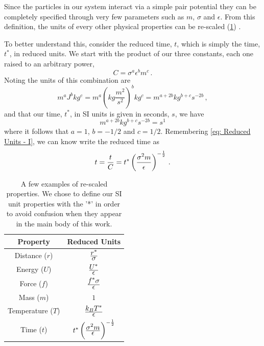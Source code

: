 \documentclass[../../main.tex]{subfiles}
\begin{document}
\begin{appendices}
    Since the particles in our system interact via a simple pair potential they can be completely specified through very few parameters such as $m$, $\sigma$ and $\epsilon$. From this definition, the units of every other physical properties can be re-scaled (\cref{tab: Reduced Units}) \cite{allenComputerSimulationLiquids2017}.
    
    To better understand this, consider the reduced time, $t$, which is simply the time, $t^*$, in reduced units. We start with the product of our three constants, each one raised to an arbitrary power,
    \begin{equation}\label{eq: Reduced Units - I}
        C = \sigma^a \epsilon^b m^c \,.
    \end{equation}
    Noting the units of this combination are
        \begin{equation}
                m^a J^b kg^c = m^a \left(kg \frac{m^2}{s^2}\right)^b kg^c = m^{a+2b} kg^{b+c} s^{-2b}\,,
        \end{equation}
    and that our time, $t^*$, in SI units is given in seconds, $s$, we have
        \begin{equation}
            m^{a+2b} kg^{b+c} s^{-2b} = s^1
        \end{equation}
    where it follows that $a = 1$, $b = -1/2$ and $c = 1/2$. Remembering \cref{eq: Reduced Units - I}, we can know write the reduced time as
        \begin{equation}
            t = \frac{t}{C} = t^* \left( \frac{\displaystyle \sigma^2m}{\displaystyle \epsilon} \right)^{-\frac{1}{2}}\,.
        \end{equation}
    \begin{table}[h]
        \centering
        \caption{A few examples of re-scaled properties. We chose to define our SI unit properties with the '*' in order to avoid confusion when they appear in the main body of this work.}
        \begin{tabular}{ || c | c || }
            \hline
    	        \textbf{Property} & \textbf{Reduced Units} \\ \hline
    	        Distance ($r$) &  $\frac{\displaystyle r^*}{\displaystyle \sigma}$ \\ \hline
    	        Energy ($U$) & $\frac{\displaystyle U^*}{\displaystyle \epsilon}$ \\ \hline
    	        Force ($f$) & $\frac{\displaystyle f^*\sigma}{\displaystyle \epsilon}$ \\ \hline
    	        Mass ($m$) & $1$ \\ \hline
    	        Temperature ($T$) & $\frac{\displaystyle k_B T^*}{\displaystyle \epsilon}$ \\ \hline
    	        Time ($t$) & $t^* \left( \frac{\displaystyle \sigma^2m}{\displaystyle \epsilon} \right)^{-\frac{1}{2}}$ \\ \hline
        \end{tabular} 
        \label{tab: Reduced Units}
    \end{table}



\end{appendices}
\end{document}
